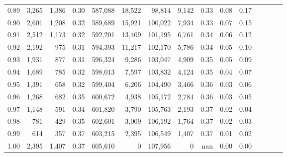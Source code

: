 \begin{tabular}{rrrcrrrrrrrrrrr}
0.89 &   3,265 &  1,386 &                                       0.30 &  587,088 &   18,522 &   98,814 &    9,142 &  0.33 &  0.08 &                         0.17 \\
0.90 &   2,601 &  1,208 &                                       0.32 &  589,689 &   15,921 &  100,022 &    7,934 &  0.33 &  0.07 &                         0.15 \\
0.91 &   2,512 &  1,173 &                                       0.32 &  592,201 &   13,409 &  101,195 &    6,761 &  0.34 &  0.06 &                         0.12 \\
0.92 &   2,192 &    975 &                                       0.31 &  594,393 &   11,217 &  102,170 &    5,786 &  0.34 &  0.05 &                         0.10 \\
0.93 &   1,931 &    877 &                                       0.31 &  596,324 &    9,286 &  103,047 &    4,909 &  0.35 &  0.05 &                         0.09 \\
0.94 &   1,689 &    785 &                                       0.32 &  598,013 &    7,597 &  103,832 &    4,124 &  0.35 &  0.04 &                         0.07 \\
0.95 &   1,391 &    658 &                                       0.32 &  599,404 &    6,206 &  104,490 &    3,466 &  0.36 &  0.03 &                         0.06 \\
0.96 &   1,268 &    682 &                                       0.35 &  600,672 &    4,938 &  105,172 &    2,784 &  0.36 &  0.03 &                         0.05 \\
0.97 &   1,148 &    591 &                                       0.34 &  601,820 &    3,790 &  105,763 &    2,193 &  0.37 &  0.02 &                         0.04 \\
0.98 &     781 &    429 &                                       0.35 &  602,601 &    3,009 &  106,192 &    1,764 &  0.37 &  0.02 &                         0.03 \\
0.99 &     614 &    357 &                                       0.37 &  603,215 &    2,395 &  106,549 &    1,407 &  0.37 &  0.01 &                         0.02 \\
1.00 &   2,395 &  1,407 &                                       0.37 &  605,610 &        0 &  107,956 &        0 &   nan &  0.00 &                         0.00 \\
\bottomrule
\end{tabular}
